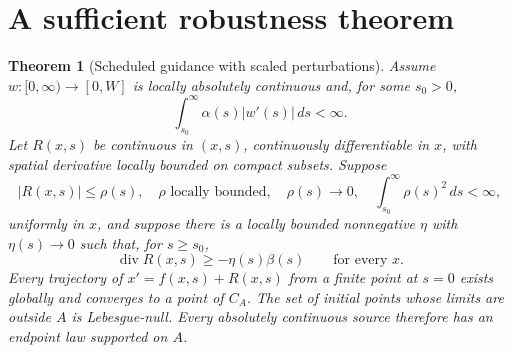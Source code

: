 \documentclass[11pt]{article}
\newtheorem{theorem}{Theorem}
\newcommand{\diver}{\operatorname{div}}
\begin{document}
\section{A sufficient robustness theorem}
\begin{theorem}[Scheduled guidance with scaled perturbations]\label{thm:robust}
Assume $w:[0,\infty)\to[0,W]$ is locally absolutely continuous and, for some
$s_0>0$,
\[
 \int_{s_0}^{\infty}\alpha(s)|w'(s)|\,ds<\infty.
\]
Let $R(x,s)$ be continuous in $(x,s)$, continuously differentiable in $x$,
with spatial derivative locally bounded on compact subsets. Suppose
\[
 |R(x,s)|\le\rho(s),\quad \rho\text{ locally bounded},\quad
 \rho(s)\to0,\quad \int_{s_0}^\infty\rho(s)^2\,ds<\infty,
\]
uniformly in $x$, and suppose there is a locally bounded nonnegative $\eta$
with $\eta(s)\to0$ such that, for $s\ge s_0$,
\[
 \diver R(x,s)\ge-\eta(s)\beta(s)\qquad\text{for every }x.
\]
Every trajectory of $x'=f(x,s)+R(x,s)$ from a finite point at $s=0$ exists
globally and converges to a point of $C_A$. The set of initial points whose
limits are outside $A$ is Lebesgue-null. Every absolutely continuous source
therefore has an endpoint law supported on $A$.
\end{theorem}
\end{document}
